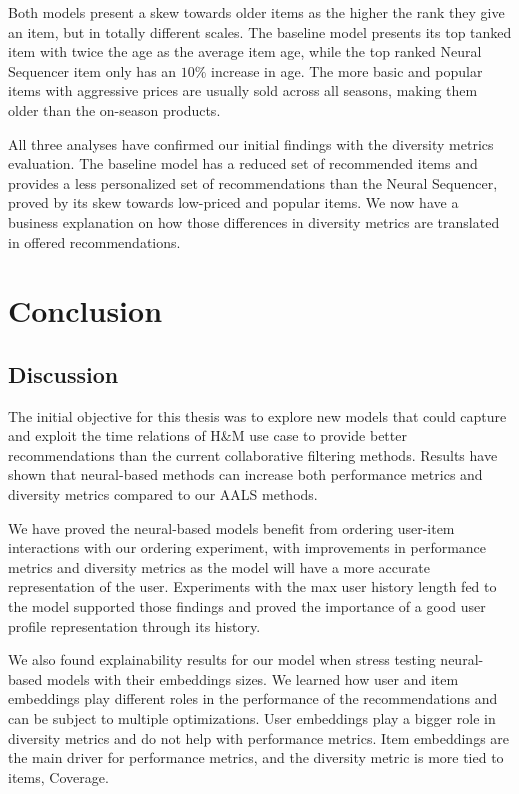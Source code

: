 \documentclass{tex_files/kththesis}
\begin{document}
Both models present a skew towards older items as the higher the rank they give an item, but in totally different scales. The baseline model presents its top tanked item with twice the age as the average item age, while the top ranked Neural Sequencer item only has an $10\%$ increase in age. The more basic and popular items with aggressive prices are usually sold across all seasons, making them older than the on-season products. 

All three analyses have confirmed our initial findings with the diversity metrics evaluation. The baseline model has a reduced set of recommended items and provides a less personalized set of recommendations than the Neural Sequencer, proved by its skew towards low-priced and popular items. We now have a business explanation on how those differences in diversity metrics are translated in offered recommendations.

\chapter{Conclusion}
\section{Discussion}
The initial objective for this thesis was to explore new models that could capture and exploit the time relations of H\&M use case to provide better recommendations than the current collaborative filtering methods. Results have shown that neural-based methods can increase both performance metrics and diversity metrics compared to our AALS methods.

We have proved the neural-based models benefit from ordering user-item interactions with our ordering experiment, with improvements in performance metrics and diversity metrics as the model will have a more accurate representation of the user. Experiments with the max user history length fed to the model supported those findings and proved the importance of a good user profile representation through its history. 

We also found explainability results for our model when stress testing neural-based models with their embeddings sizes. We learned how user and item embeddings play different roles in the performance of the recommendations and can be subject to multiple optimizations. User embeddings play a bigger role in diversity metrics and do not help with performance metrics. Item embeddings are the main driver for performance metrics, and the diversity metric is more tied to items, Coverage.
\end{document}
